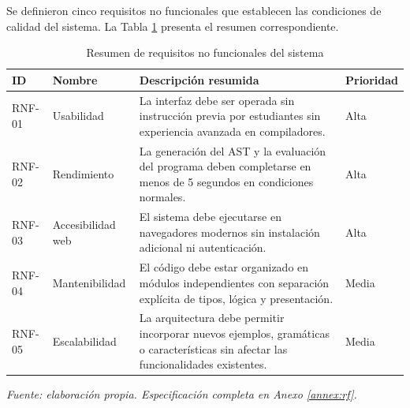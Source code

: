 Se definieron cinco requisitos no funcionales que establecen las condiciones de calidad del sistema. La Tabla \ref{tab:rnf_resumen} presenta el resumen correspondiente.

\begin{table}[H]
\centering
\caption{Resumen de requisitos no funcionales del sistema}
\label{tab:rnf_resumen}
\footnotesize
\setlength{\tabcolsep}{4pt}
\begin{tabular}{
  >{\centering\arraybackslash}p{1.4cm}
  >{\raggedright\arraybackslash}p{3.5cm}
  >{\raggedright\arraybackslash}p{8.2cm}
  >{\centering\arraybackslash}p{1.3cm}
}
\hline
\textbf{ID} & \textbf{Nombre} & \textbf{Descripción resumida} & \textbf{Prioridad} \\
\hline
RNF-01 & Usabilidad & La interfaz debe ser operada sin instrucción previa por estudiantes sin experiencia avanzada en compiladores. & Alta \\
RNF-02 & Rendimiento & La generación del AST y la evaluación del programa deben completarse en menos de 5 segundos en condiciones normales. & Alta \\
RNF-03 & Accesibilidad web & El sistema debe ejecutarse en navegadores modernos sin instalación adicional ni autenticación. & Alta \\
RNF-04 & Mantenibilidad & El código debe estar organizado en módulos independientes con separación explícita de tipos, lógica y presentación. & Media \\
RNF-05 & Escalabilidad & La arquitectura debe permitir incorporar nuevos ejemplos, gramáticas o características sin afectar las funcionalidades existentes. & Media \\
\hline
\end{tabular}
\vskip 4pt
\footnotesize\textit{Fuente: elaboración propia. Especificación completa en Anexo \ref{annex:rf}.}
\end{table}

\FloatBarrier

